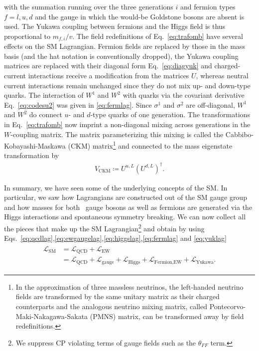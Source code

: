 with the summation running over the three generations $i$ and fermion
types $f=l,u,d$ and the gauge in which the would-be Goldstone bosons are absent is used. The Yukawa coupling between fermions and the Higgs
field is thus proportional to $m_{f,i}/v$. The field redefinitions of
Eq.~\eqref{eq:trafomb} have several effects on the SM
Lagrangian. Fermion fields are replaced by those in the mass basis
(and the hat notation is conventionally dropped),
the Yukawa coupling matrices are replaced with their diagonal form
Eq.~\eqref{eq:diagyuk} and charged-current interactions receive a
modification from the matrices $U$, whereas neutral current
interactions remain unchanged since they do not mix up- and down-type quarks. The interaction of $W^{1}$ and $W^2$
with quarks via the
covariant derivative Eq.~\eqref{eq:codesu2} was given in
\eqref{eq:fermlag}. Since $\sigma^1$ and $\sigma^2$ are off-diagonal,
$W^{1}$ and $W^2$ do connect $u$- and $d$-type
quarks of one generation. The transformations in
Eq.~\eqref{eq:trafomb} now imprint a non-diagonal mixing across generations in the $W$-coupling
matrix. The matrix parameterizing this mixing is called the
Cabbibo-Kobayashi-Maskawa \cite{Cabibbo1963,Kobayashi1973} (CKM)
matrix\footnote{In the approximation of three massless neutrinos, the left-handed neutrino fields are transformed by the same unitary matrix as their charged counterparts and the analogous neutrino mixing matrix, called Pontecorvo-Maki-Nakagawa-Sakata (PMNS) matrix, can be transformed away by field redefinitions.} and connected to the mass eigenstate transformation by
\begin{align}
  V_{\text{CKM}} \coloneqq U^{u,L}\left(U^{d,L}\right)^{\dagger}.
\end{align}

In summary, we have seen some of the underlying concepts of the
SM. In particular, we saw how Lagrangians are constructed out of the SM gauge
group and how masses for both \ew~gauge bosons as well as fermions are generated via the Higgs interactions and spontaneous symmetry
breaking. We can now collect all the pieces that make up the SM Lagrangian\footnote{We suppress CP violating terms of gauge fields such as the $\theta_{FF}$ term.} and obtain by using
Eqs.~\eqref{eq:qcdlag},\eqref{eq:ewgaugelag},\eqref{eq:higgslag},\eqref{eq:fermlag}
and \eqref{eq:yuklag}
\begin{align}
\begin{split}
  \mathcal{L}_{\text{SM}}&=\mathcal{L}_{\text{QCD}}+\mathcal{L}_{\text{EW}}\\
&=\mathcal{L}_{\text{QCD}}+\mathcal{L}_{\text{gauge}}+\mathcal{L}_{\text{Higgs}}+\mathcal{L}_{\text{Fermion,EW}}+\mathcal{L}_{\text{Yukawa}}.
\end{split}
\end{align}



